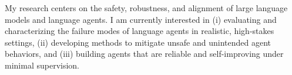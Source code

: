 My research centers on the safety, robustness, and alignment of large language models and language agents. I am currently interested in (i) evaluating and characterizing the failure modes of language agents in realistic, high-stakes settings, (ii) developing methods to mitigate unsafe and unintended agent behaviors, and (iii) building agents that are reliable and self-improving under minimal supervision.
